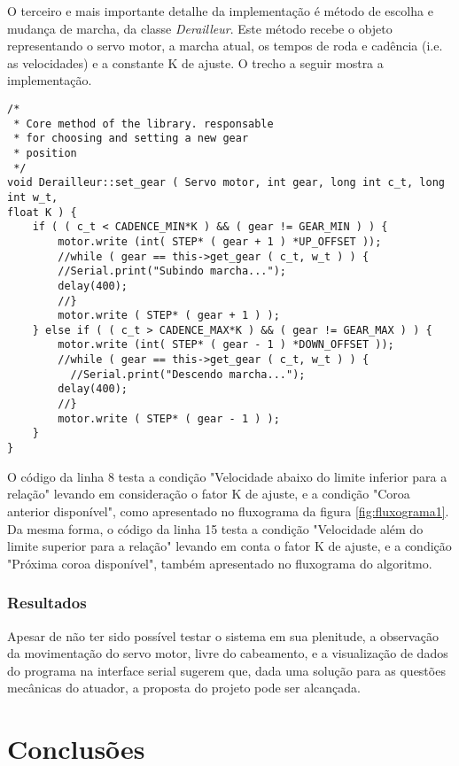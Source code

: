 \documentclass[a4paper,11pt]{article}
\begin{document}
O terceiro e mais importante detalhe da implementação é método de escolha e
mudança de marcha, da classe \textit{Derailleur}. Este método recebe o objeto
representando o servo motor, a marcha atual, os tempos de roda e cadência (i.e.
as velocidades) e a constante K de ajuste. O trecho a seguir mostra a
implementação.
\begin{lstlisting}
/*
 * Core method of the library. responsable
 * for choosing and setting a new gear
 * position
 */
void Derailleur::set_gear ( Servo motor, int gear, long int c_t, long int w_t,
float K ) {
    if ( ( c_t < CADENCE_MIN*K ) && ( gear != GEAR_MIN ) ) {
        motor.write (int( STEP* ( gear + 1 ) *UP_OFFSET ));
        //while ( gear == this->get_gear ( c_t, w_t ) ) {
        //Serial.print("Subindo marcha...");
        delay(400);
        //}
        motor.write ( STEP* ( gear + 1 ) );
    } else if ( ( c_t > CADENCE_MAX*K ) && ( gear != GEAR_MAX ) ) {
        motor.write (int( STEP* ( gear - 1 ) *DOWN_OFFSET ));
        //while ( gear == this->get_gear ( c_t, w_t ) ) {
          //Serial.print("Descendo marcha...");
        delay(400);
        //}
        motor.write ( STEP* ( gear - 1 ) );
    }
}
\end{lstlisting}
O código da linha 8 testa a condição "Velocidade abaixo do limite inferior
para a relação" levando em consideração o fator K de ajuste, e a condição
"Coroa anterior disponível", como apresentado no fluxograma da figura
\ref{fig:fluxograma1}. Da mesma forma, o código da linha 15 testa a condição
"Velocidade além do limite superior para a relação" levando em conta o fator K
de ajuste, e a condição "Próxima coroa disponível", também apresentado no
fluxograma do algoritmo.

\subsubsection{Resultados}
\label{sec:resultados}
Apesar de não ter sido possível testar o sistema em sua plenitude, a observação
da movimentação do servo motor, livre do cabeamento, e a visualização de dados
do programa na interface serial sugerem que, dada uma solução para as questões
mecânicas do atuador, a proposta do projeto pode ser alcançada.


\pagebreak
%
\section{Conclusões}
\label{sec:conclusoes}
\end{document}
